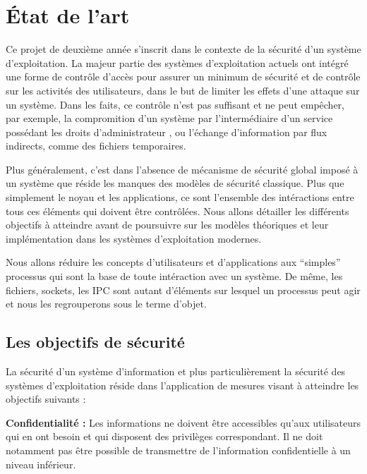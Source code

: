 \section{\'Etat de l'art}

Ce projet de deuxième année s'inscrit dans le contexte de la sécurité d'un système d'exploitation. La majeur partie des systèmes d'exploitation actuels ont intégré une forme de contrôle d'accès pour assurer un minimum de sécurité et de contrôle sur les activités des utilisateurs, dans le but de limiter les effets d'une attaque sur un système. Dans les faits, ce contrôle n'est pas suffisant et ne peut empêcher, par exemple, la compromition d'un système par l'intermédiaire d'un service possédant les droits d'administrateur \cite{TIOF}, ou l'échange d'information par flux indirects, comme des fichiers temporaires.

Plus généralement, c'est dans l'absence de mécanisme de sécurité global imposé à un système que réside les manques des modèles de sécurité classique. Plus que simplement le noyau et les applications, ce sont l'ensemble des intéractions entre tous ces éléments qui doivent être contrôlées. Nous allons détailler les différents objectifs à atteindre avant de poursuivre sur les modèles théoriques et leur implémentation dans les systèmes d'exploitation modernes.


Nous allons réduire les concepts d'utilisateurs et d'applications aux ``simples'' processus qui sont la base de toute intéraction avec un système. De même, les fichiers, sockets, les IPC sont autant d'éléments sur lesquel un processus peut agir et nous les regrouperons sous le terme d'objet.

\subsection{Les objectifs de sécurité}

La sécurité d'un système d'information et plus particulièrement la sécurité des systèmes d'exploitation réside dans l'application de mesures visant à atteindre les objectifs suivants :

\textbf{Confidentialité :}
Les informations ne doivent être accessibles qu'aux utilisateurs qui en ont besoin et qui disposent des privilèges correspondant. Il ne doit notamment pas être possible de transmettre de l'information confidentielle à un niveau inférieur.

